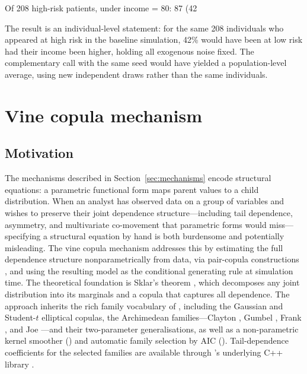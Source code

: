 \documentclass[article]{jss}
\begin{document}
\begin{CodeOutput}
Of 208 high-risk patients, under income = 80: 87 (42%
\end{CodeOutput}

\noindent
The result is an individual-level statement: for the same 208 individuals who
appeared at high risk in the baseline simulation, 42\% would have been at low risk
had their income been higher, holding all exogenous noise fixed. The complementary
 call with the same seed would have yielded a population-level
average, using new independent draws rather than the same individuals.

\section{Vine copula mechanism}
\label{sec:copula}

\subsection{Motivation}

The mechanisms described in Section~\ref{sec:mechanisms} encode structural
equations: a parametric functional form maps parent values to a child distribution.
When an analyst has observed data on a group of variables and wishes to preserve
their joint dependence structure---including tail dependence, asymmetry, and
multivariate co-movement that parametric forms would miss---specifying a structural
equation by hand is both burdensome and potentially misleading. The vine copula
mechanism addresses this by estimating the full dependence structure nonparametrically
from data, via pair-copula constructions \citep{bedford2002vines, aas2009pair},
and using the resulting model as the conditional generating rule at simulation time.
The theoretical foundation is Sklar's theorem \citep{sklar1959fonctions}, which
decomposes any joint distribution into its marginals and a copula that captures all
dependence. The approach inherits the rich family vocabulary of 
\citep{nagler2022rvinecopulib}, including the Gaussian and Student-$t$ elliptical
copulas, the Archimedean families---Clayton \citep{clayton1978model}, Gumbel
\citep{gumbel1960bivariate}, Frank \citep{frank1979}, and Joe \citep{joe1993}---and
their two-parameter generalisations, as well as a non-parametric kernel smoother
\citep{nagler2016evading} () and automatic family selection by AIC
\citep{czado2019analyzing} (). Tail-dependence coefficients for the
selected families are available through 's underlying
 C++ library \citep{joe2014dependence}.
\end{document}
